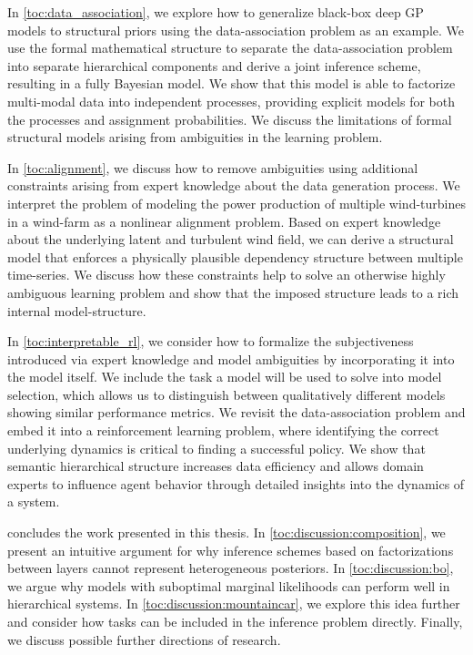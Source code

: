 In \cref{toc:data_association}, we explore how to generalize black-box deep GP models to structural priors using the data-association problem as an example.
We use the formal mathematical structure to separate the data-association problem into separate hierarchical components and derive a joint inference scheme, resulting in a fully Bayesian model.
We show that this model is able to factorize multi-modal data into independent processes, providing explicit models for both the processes and assignment probabilities.
We discuss the limitations of formal structural models arising from ambiguities in the learning problem.

In \cref{toc:alignment}, we discuss how to remove ambiguities using additional constraints arising from expert knowledge about the data generation process.
We interpret the problem of modeling the power production of multiple wind-turbines in a wind-farm as a nonlinear alignment problem.
Based on expert knowledge about the underlying latent and turbulent wind field, we can derive a structural model that enforces a physically plausible dependency structure between multiple time-series.
We discuss how these constraints help to solve an otherwise highly ambiguous learning problem and show that the imposed structure leads to a rich internal model-structure.

In \cref{toc:interpretable_rl}, we consider how to formalize the subjectiveness introduced via expert knowledge and model ambiguities by incorporating it into the model itself.
We include the task a model will be used to solve into model selection, which allows us to distinguish between qualitatively different models showing similar performance metrics.
We revisit the data-association problem and embed it into a reinforcement learning problem, where identifying the correct underlying dynamics is critical to finding a successful policy.
We show that semantic hierarchical structure increases data efficiency and allows domain experts to influence agent behavior through detailed insights into the dynamics of a system.

 concludes the work presented in this thesis.
In \cref{toc:discussion:composition}, we present an intuitive argument for why inference schemes based on factorizations between layers cannot represent heterogeneous posteriors.
In \cref{toc:discussion:bo}, we argue why models with suboptimal marginal likelihoods can perform well in hierarchical systems.
In \cref{toc:discussion:mountaincar}, we explore this idea further and consider how tasks can be included in the inference problem directly.
Finally, we discuss possible further directions of research.

